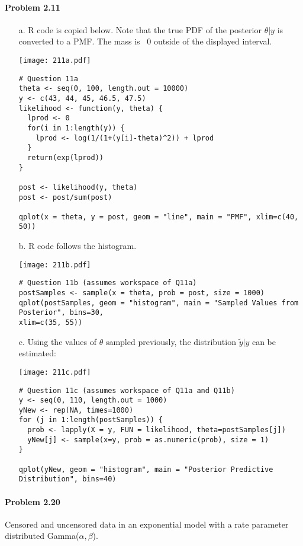 \documentclass[10pt]{article}
\begin{document}
\paragraph{Problem 2.11}
\begin{enumerate}
\item[a.] R code is copied below. Note that the true PDF of the posterior $\theta | y$ is converted to a PMF. The mass is ~0 outside of the displayed interval.
\begin{center}
\texttt{[image: 211a.pdf]}
\begin{Verbatim}
# Question 11a
theta <- seq(0, 100, length.out = 10000)
y <- c(43, 44, 45, 46.5, 47.5)
likelihood <- function(y, theta) {
  lprod <- 0
  for(i in 1:length(y)) {
    lprod <- log(1/(1+(y[i]-theta)^2)) + lprod
  }
  return(exp(lprod))
}

post <- likelihood(y, theta)
post <- post/sum(post)

qplot(x = theta, y = post, geom = "line", main = "PMF", xlim=c(40, 50))
\end{Verbatim}
\end{center}
\item[b.] R code follows the histogram.
\begin{center}
\texttt{[image: 211b.pdf]}
\begin{Verbatim}
# Question 11b (assumes workspace of Q11a)
postSamples <- sample(x = theta, prob = post, size = 1000)
qplot(postSamples, geom = "histogram", main = "Sampled Values from Posterior", bins=30, 
xlim=c(35, 55))
\end{Verbatim}
\end{center}
\item[c.] Using the values of $\theta$ sampled previously, the distribution $\tilde{y} | y$ can be estimated:
\begin{center}
\texttt{[image: 211c.pdf]}
\begin{Verbatim}
# Question 11c (assumes workspace of Q11a and Q11b)
y <- seq(0, 110, length.out = 1000)
yNew <- rep(NA, times=1000)
for (j in 1:length(postSamples)) {
  prob <- lapply(X = y, FUN = likelihood, theta=postSamples[j])
  yNew[j] <- sample(x=y, prob = as.numeric(prob), size = 1)
}

qplot(yNew, geom = "histogram", main = "Posterior Predictive Distribution", bins=40)
\end{Verbatim}
\end{center}
\end{enumerate}

\paragraph{Problem 2.20} Censored and uncensored data in an exponential model with a rate parameter distributed Gamma($\alpha, \beta$).
\end{document}
